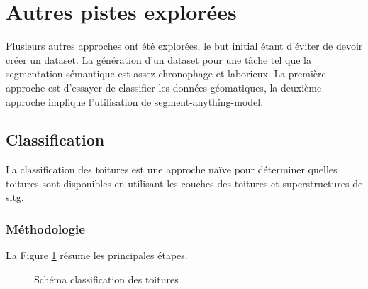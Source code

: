 \section{Autres pistes explorées}
\label{sec:pistes_explorees}
Plusieurs autres approches ont été explorées, le but initial étant d'éviter de devoir créer un dataset. La génération d'un dataset pour une tâche tel que la segmentation sémantique est assez chronophage et laborieux. La première approche est d'essayer de classifier les données géomatiques, la deuxième approche implique l'utilisation de segment-anything-model.

\subsection{Classification}
La classification des toitures est une approche naïve pour déterminer quelles toitures sont disponibles en utilisant les couches des toitures et superstructures de \acrshort{sitg}.

\subsubsection{Méthodologie}
La Figure \ref{fig:ch3_piste_exploree_classification_01_workflow} résume les principales étapes. 

\begin{figure}[H]
    \centering
    \caption{Schéma classification des toitures}
    \label{fig:ch3_piste_exploree_classification_01_workflow}
\end{figure}

